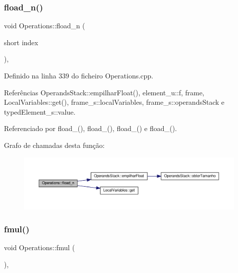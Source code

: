 \subsubsection{\texorpdfstring{fload\+\_\+n()}{fload\_n()}}
{\footnotesize\ttfamily void Operations\+::fload\+\_\+n (\begin{DoxyParamCaption}\item[{short}]{index }\end{DoxyParamCaption})\hspace{0.3cm}{\ttfamily [static]}, {\ttfamily [private]}}



Definido na linha 339 do ficheiro Operations.\+cpp.



Referências Operands\+Stack\+::empilhar\+Float(), element\+\_\+u\+::f, frame, Local\+Variables\+::get(), frame\+\_\+s\+::local\+Variables, frame\+\_\+s\+::operands\+Stack e typed\+Element\+\_\+s\+::value.



Referenciado por fload\+\_(), fload\+\_(), fload\+\_() e fload\+\_().

Grafo de chamadas desta função\+:\nopagebreak
\begin{figure}[H]
\begin{center}
\leavevmode
\includegraphics[width=350pt]{classOperations_af466511fbbf8fd71f6dd31b0433df181_cgraph}
\end{center}
\end{figure}
\mbox{\label{classOperations_ad4caf68c912edd7bfac5c8d74c1e2036}} 
\subsubsection{\texorpdfstring{fmul()}{fmul()}}
{\footnotesize\ttfamily void Operations\+::fmul (\begin{DoxyParamCaption}{ }\end{DoxyParamCaption})\hspace{0.3cm}{\ttfamily [static]}, {\ttfamily [private]}}




